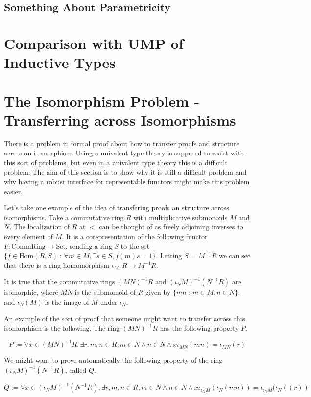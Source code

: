 \documentclass[12pt]{article} %
\theoremstyle{definition}
\theoremstyle{definition}
\theoremstyle{definition}
\theoremstyle{definition}
\begin{document}
\subsection{Something About Parametricity}

\section{Comparison with UMP of Inductive Types}

\section{The Isomorphism Problem - Transferring across Isomorphisms}

There is a problem in formal proof about how to transfer proofs and structure across an isomorphism. Using
a univalent type theory is supposed to assist with this sort of problems, but even in a univalent type theory this
is a difficult problem. The aim of this section is to show why it is still a difficult problem and why having
a robust interface for representable functors might make this problem easier.

Let's take one example of the idea of transfering proofs an structure across isomorphisms. Take a commutative
ring $R$ with multiplicative submonoids $M$ and $N$. The localization of $R$ at $<$ can be thought of as freely
adjoining inverses to every element of $M$. It is a corepresentation of the following functor
$F : \text{CommRing} \to \text{Set}$, sending a ring $S$ to the set
$\{ f \in \text{Hom}(R, S) \ : \ \forall m \in M, \exists s \in S, f(m)s = 1 \}$.
Letting $S$ = $M^{-1}R$ we can see that there is a ring homomorphism $\iota_M : R \to M^{-1}R$.

It is true that the commutative rings $(MN)^{-1}R$ and $(\iota_N M)^{-1}(N^{-1}R)$ are isomorphic,
where $MN$ is the submomoid of $R$ given by $\{ mn \ : \ m \in M, n \in N \}$, and $\iota_N(M)$ is the
image of $M$ under $\iota_N$.

An example of the sort of proof that someone might want to transfer across this isomorphism is the
following. The ring $(MN)^{-1}R$ has the following property $P$.

\begin{equation}
  P := \forall x \in (MN)^{-1}R, \exists r, m, n \in R, m \in N \wedge n \in N \wedge x\iota_{MN}(mn) = \iota_{MN}(r)
\end{equation}

We might want to prove automatically the following property of the ring $(\iota_N M)^{-1}(N^{-1}R)$, called $Q$.

\begin{equation}
  Q := \forall x \in (\iota_N M)^{-1}(N^{-1}R), \exists r, m, n \in R, m \in N \wedge n \in N \wedge x\iota_{\iota_N M}(\iota_N(mn)) =
  \iota_{\iota_N M}(\iota_N((r))
\end{equation}
\end{document}
